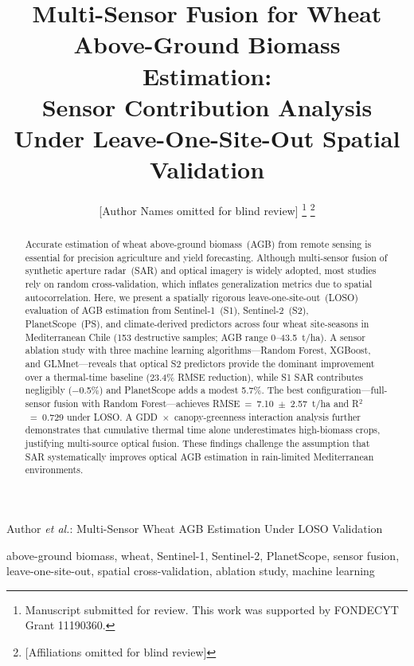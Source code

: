 \documentclass[lettersize,journal]{IEEEtran}
\begin{document}
\title{Multi-Sensor Fusion for Wheat Above-Ground Biomass Estimation:\\
Sensor Contribution Analysis Under Leave-One-Site-Out Spatial Validation}

\author{[Author Names omitted for blind review]%
\thanks{Manuscript submitted for review. This work was supported by FONDECYT Grant 11190360.}%
\thanks{[Affiliations omitted for blind review]}}

%
{Author \MakeLowercase{\textit{et al.}}: Multi-Sensor Wheat AGB Estimation Under LOSO Validation}


\maketitle

\begin{abstract}
Accurate estimation of wheat above-ground biomass~(AGB) from remote sensing
is essential for precision agriculture and yield forecasting. Although
multi-sensor fusion of synthetic aperture radar~(SAR) and optical imagery is
widely adopted, most studies rely on random cross-validation, which inflates
generalization metrics due to spatial autocorrelation. Here, we present a
spatially rigorous leave-one-site-out~(LOSO) evaluation of AGB estimation
from Sentinel-1~(S1), Sentinel-2~(S2), PlanetScope~(PS), and climate-derived
predictors across four wheat site-seasons in Mediterranean Chile (153
destructive samples; AGB range 0--43.5~t/ha). A sensor ablation study with
three machine learning algorithms---Random Forest, XGBoost, and
GLMnet---reveals that optical S2 predictors provide the dominant improvement
over a thermal-time baseline (23.4\% RMSE reduction), while S1 SAR
contributes negligibly ($-$0.5\%) and PlanetScope adds a modest 5.7\%.
The best configuration---full-sensor fusion with Random Forest---achieves
RMSE~=~7.10~$\pm$~2.57~t/ha and R$^2$~=~0.729 under LOSO. A
GDD~$\times$~canopy-greenness interaction analysis further demonstrates that
cumulative thermal time alone underestimates high-biomass crops, justifying
multi-source optical fusion. These findings challenge the assumption that SAR
systematically improves optical AGB estimation in rain-limited Mediterranean
environments.
\end{abstract}

\begin{IEEEkeywords}
above-ground biomass, wheat, Sentinel-1, Sentinel-2, PlanetScope,
sensor fusion, leave-one-site-out, spatial cross-validation, ablation study,
machine learning
\end{IEEEkeywords}
\end{document}
